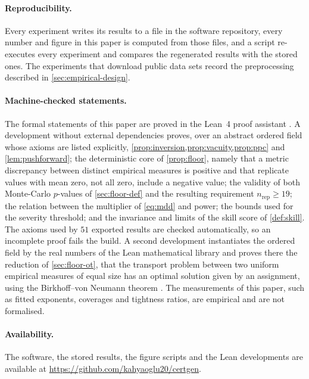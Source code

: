 \documentclass[twoside,11pt]{article}
\theoremstyle{plain}
\theoremstyle{definition}
\theoremstyle{remark}
\newcommand{\repourl}{\url{https://github.com/kahyaoglu20/certgen}}
\begin{document}
\paragraph{Reproducibility.} Every experiment writes its results to a
file in the software repository, every number and figure in this paper is
computed from those files, and a script re-executes every experiment and
compares the regenerated results with the stored ones. The experiments that
download public data sets record the preprocessing described in
\cref{sec:empirical-design}.

\paragraph{Machine-checked statements.} The formal statements of this
paper are proved in the Lean~4 proof assistant \citep{demoura2021}. A
development without external dependencies proves, over an abstract ordered
field whose axioms are listed explicitly,
\cref{prop:inversion,prop:vacuity,prop:ppc} and \cref{lem:pushforward};
the deterministic core of \cref{prop:floor}, namely that a metric
discrepancy between distinct empirical measures is positive and that
replicate values with mean zero, not all zero, include a negative value;
the validity of both Monte-Carlo $p$-values of
\cref{sec:floor-def} and the resulting requirement $n_{\mathrm{rep}} \geq 19$;
the relation between the multiplier of \cref{eq:mdd} and power; the bounds
used for the severity threshold; and the invariance and limits of the skill
score of \cref{def:skill}. The axioms used by $51$ exported results are
checked automatically, so an incomplete proof fails the build. A second
development instantiates the ordered field by the real numbers of the Lean
mathematical library \citep{mathlib2020} and proves there the reduction of
\cref{sec:floor-ot}, that the transport problem between two uniform empirical
measures of equal size has an optimal solution given by an assignment, using
the Birkhoff--von Neumann theorem \citep{birkhoff1946}. The measurements of
this paper, such as fitted exponents, coverages and tightness ratios, are
empirical and are not formalised.

\paragraph{Availability.} The software, the stored results, the figure
scripts and the Lean developments are available at
\repourl.

\end{document}

